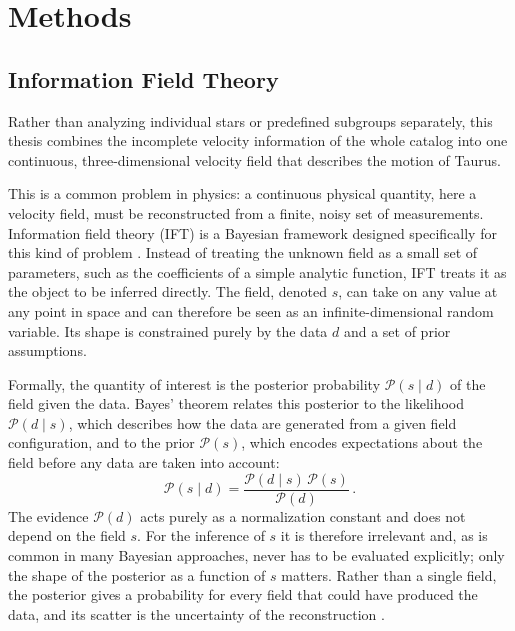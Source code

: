 \chapter{Methods}
\label{sec:Methods}

\section{Information Field Theory}
\label{sec:ift}

Rather than analyzing individual stars or predefined subgroups separately, this thesis combines
the incomplete velocity information of the whole catalog into one continuous, three-dimensional
velocity field that describes the motion of Taurus.

This is a common problem in physics: a continuous physical quantity, here a velocity
field, must be reconstructed from a finite, noisy set of measurements. Information field
theory (IFT) is a Bayesian framework designed specifically for this kind of problem
\citep{Ensslin2023_ITIFT,Ensslin2025}. Instead of treating the unknown field as a small
set of parameters, such as the coefficients of a simple analytic function, IFT treats it
as the object to be inferred directly. The field, denoted $s$, can take on any value at any
point in space and can therefore be seen as an infinite-dimensional random variable. Its
shape is constrained purely by the data $d$ and a set of prior assumptions.

Formally, the quantity of interest is the posterior probability $\mathcal{P}(s\mid d)$ of
the field given the data. Bayes' theorem relates this posterior to the likelihood
$\mathcal{P}(d\mid s)$, which describes how the data are generated from a given field
configuration, and to the prior $\mathcal{P}(s)$, which encodes expectations about the
field before any data are taken into account:
\begin{equation}
    \mathcal{P}(s \mid d) = \frac{\mathcal{P}(d \mid s)\,\mathcal{P}(s)}{\mathcal{P}(d)} \, .
    \label{eq:bayes}
\end{equation}
The evidence $\mathcal{P}(d)$ acts purely as a normalization constant and does not depend on
the field $s$. For the inference of $s$ it is therefore irrelevant and, as is common in many
Bayesian approaches, never has to be evaluated explicitly; only the shape of the posterior as
a function of $s$ matters. Rather than a single field, the posterior gives a probability for every field that could have
produced the data, and its scatter is the uncertainty of the reconstruction
\citep{Ensslin2023_ITIFT,Ensslin2025}.


